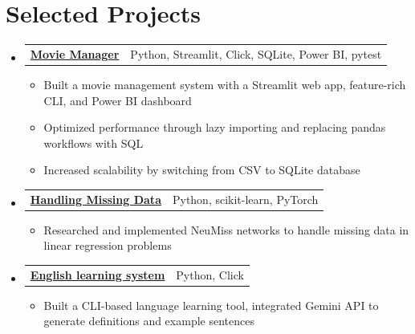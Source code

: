 \documentclass[letterpaper,11pt]{article}
\makeatletter
\newcommand{\subheading}[2]{
    \normalsize
    \begin{tabular*}{0.97\textwidth}[t]{l@{\extracolsep{\fill}}r}
      \textbf{#1} & #2 \\
    \end{tabular*}
    \vspace{-2pt}
}
\makeatother
\begin{document}


\section{Selected Projects}
\begin{itemize}
    \item \subheading{\href{https://github.com/ngntrgduc/movie-manager}{Movie Manager \faGithub}}
        {Python, Streamlit, Click, SQLite, Power BI, pytest}
        \begin{itemize}
            \item Built a movie management system with a
            Streamlit web app, 
            feature-rich CLI, and Power BI dashboard 
            \item Optimized performance through lazy importing and replacing pandas workflows with SQL
            \item Increased scalability by switching from CSV to SQLite database
        \end{itemize}

    \item \subheading{\href{https://github.com/ngntrgduc/seminar}{Handling Missing Data \faGithub}}
        {Python, scikit-learn, PyTorch}
        \begin{itemize}
            \item Researched and implemented NeuMiss networks to handle missing data in linear regression problems
        \end{itemize}
    
    \item \subheading{\href{https://github.com/ngntrgduc/english-learning-system}{English learning system \faGithub}}
        {Python, Click}
        \begin{itemize}
            \item Built a 
            CLI-based
            language learning tool, integrated Gemini API to generate definitions and example sentences
        \end{itemize}


\end{itemize}
\end{document}
